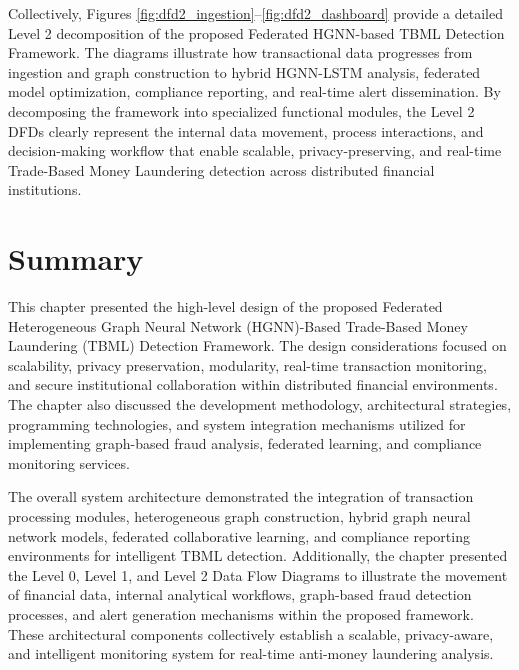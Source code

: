 
Collectively, Figures \ref{fig:dfd2_ingestion}--\ref{fig:dfd2_dashboard} provide a detailed Level 2 decomposition of the proposed Federated HGNN-based TBML Detection Framework. The diagrams illustrate how transactional data progresses from ingestion and graph construction to hybrid HGNN-LSTM analysis, federated model optimization, compliance reporting, and real-time alert dissemination. By decomposing the framework into specialized functional modules, the Level 2 DFDs clearly represent the internal data movement, process interactions, and decision-making workflow that enable scalable, privacy-preserving, and real-time Trade-Based Money Laundering detection across distributed financial institutions.

\section{Summary}
This chapter presented the high-level design of the proposed Federated Heterogeneous Graph Neural Network (HGNN)-Based Trade-Based Money Laundering (TBML) Detection Framework. The design considerations focused on scalability, privacy preservation, modularity, real-time transaction monitoring, and secure institutional collaboration within distributed financial environments. The chapter also discussed the development methodology, architectural strategies, programming technologies, and system integration mechanisms utilized for implementing graph-based fraud analysis, federated learning, and compliance monitoring services.

The overall system architecture demonstrated the integration of transaction processing modules, heterogeneous graph construction, hybrid graph neural network models, federated collaborative learning, and compliance reporting environments for intelligent TBML detection. Additionally, the chapter presented the Level 0, Level 1, and Level 2 Data Flow Diagrams to illustrate the movement of financial data, internal analytical workflows, graph-based fraud detection processes, and alert generation mechanisms within the proposed framework. These architectural components collectively establish a scalable, privacy-aware, and intelligent monitoring system for real-time anti-money laundering analysis.